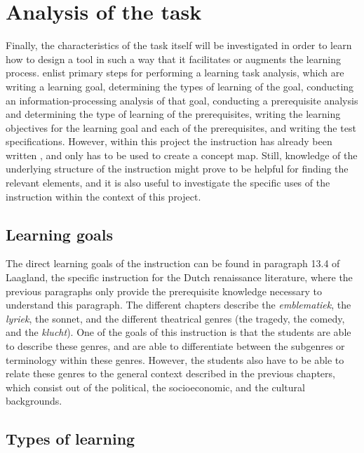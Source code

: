 \section{Analysis of the task}
\label{sec:taskanalysis}

Finally, the characteristics of the task itself will be investigated in order to learn how to design a tool in such a way that it facilitates or augments the learning process.  enlist primary steps for performing a learning task analysis, which are writing a learning goal, determining the types of learning of the goal, conducting an information-processing analysis of that goal, conducting a prerequisite analysis and determining the type of learning of the prerequisites, writing the learning objectives for the learning goal and each of the prerequisites, and writing the test specifications. However, within this project the instruction has already been written \cite{laagland}, and only has to be used to create a concept map. Still, knowledge of the underlying structure of the instruction might prove to be helpful for finding the relevant elements, and it is also useful to investigate the specific uses of the instruction within the context of this project.

\subsection{Learning goals}

The direct learning goals of the instruction can be found in paragraph 13.4 of Laagland, the specific instruction for the Dutch renaissance literature, where the previous paragraphs only provide the prerequisite knowledge necessary to understand this paragraph. The different chapters describe the \emph{emblematiek}, the \emph{lyriek}, the sonnet, and the different theatrical genres (the tragedy, the comedy, and the \emph{klucht}). One of the goals of this instruction is that the students are able to describe these genres, and are able to differentiate between the subgenres or terminology within these genres. However, the students also have to be able to relate these genres to the general context described in the previous chapters, which consist out of the political, the socioeconomic, and the cultural backgrounds.

\subsection{Types of learning}

